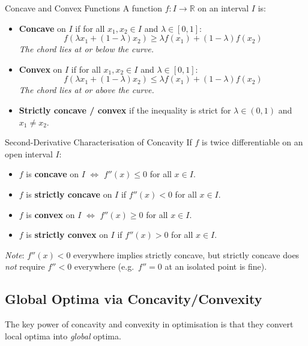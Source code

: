 \documentclass[12pt, a4paper]{article}
\theoremstyle{definition}
\newcommand{\R}{\mathbb{R}}
\begin{document}
\begin{defbox}{Concave and Convex Functions}
A function $f : I \to \R$ on an interval $I$ is:
\begin{itemize}
  \item \textbf{Concave} on $I$ if for all $x_1, x_2 \in I$ and
        $\lambda \in [0,1]$:
        \[
          f(\lambda x_1 + (1-\lambda)x_2)
          \geq \lambda f(x_1) + (1-\lambda)f(x_2)
        \]
        \emph{The chord lies at or below the curve.}

  \item \textbf{Convex} on $I$ if for all $x_1, x_2 \in I$ and
        $\lambda \in [0,1]$:
        \[
          f(\lambda x_1 + (1-\lambda)x_2)
          \leq \lambda f(x_1) + (1-\lambda)f(x_2)
        \]
        \emph{The chord lies at or above the curve.}

  \item \textbf{Strictly concave / convex} if the inequality is strict for
        $\lambda \in (0,1)$ and $x_1 \neq x_2$.
\end{itemize}
\end{defbox}

\begin{thmbox}{Second-Derivative Characterisation of Concavity}
If $f$ is twice differentiable on an open interval $I$:
\begin{itemize}
  \item $f$ is \textbf{concave} on $I$ $\iff$ $f''(x) \leq 0$ for all
        $x \in I$.
  \item $f$ is \textbf{strictly concave} on $I$ if $f''(x) < 0$ for all
        $x \in I$.
  \item $f$ is \textbf{convex} on $I$ $\iff$ $f''(x) \geq 0$ for all
        $x \in I$.
  \item $f$ is \textbf{strictly convex} on $I$ if $f''(x) > 0$ for all
        $x \in I$.
\end{itemize}
\emph{Note}: $f''(x) < 0$ everywhere implies strictly concave, but strictly
concave does \emph{not} require $f''<0$ everywhere (e.g.\ $f''=0$ at an
isolated point is fine).
\end{thmbox}

\subsection{Global Optima via Concavity/Convexity}

The key power of concavity and convexity in optimisation is that they convert
local optima into \emph{global} optima.
\end{document}
